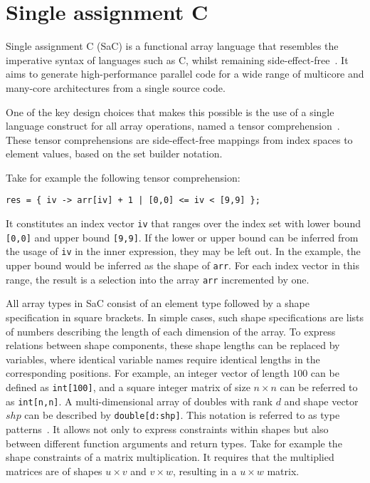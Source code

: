 \section{Single assignment C}\label{sac}
Single assignment C (SaC) is a functional array language that resembles the imperative syntax of
languages such as C, whilst remaining side-effect-free~\cite{sac1,sac2}. It aims to generate
high-performance parallel code for a wide range of multicore and many-core architectures from a
single source code.

One of the key design choices that makes this possible is the use of a single language construct for
all array operations, named a tensor comprehension~\cite{sac-tensor}. These tensor comprehensions
are side-effect-free mappings from index spaces to element values, based on the set builder
notation.

Take for example the following tensor comprehension:
\begin{verbatim}
res = { iv -> arr[iv] + 1 | [0,0] <= iv < [9,9] };
\end{verbatim}

It constitutes an index vector \verb|iv| that ranges over the index set with lower bound
\verb|[0,0]| and upper bound \verb|[9,9]|. If the lower or upper bound can be inferred from the
usage of \verb|iv| in the inner expression, they may be left out. In the example, the upper bound
would be inferred as the shape of \verb|arr|. For each index vector in this range, the result is a
selection into the array \verb|arr| incremented by one.

All array types in SaC consist of an element type followed by a shape specification in square
brackets. In simple cases, such shape specifications are lists of numbers describing the length of
each dimension of the array. To express relations between shape components, these shape lengths can
be replaced by variables, where identical variable names require identical lengths in the
corresponding positions. For example, an integer vector of length $100$ can be defined as
\verb|int[100]|, and a square integer matrix of size $n \times n$ can be referred to as
\verb|int[n,n]|. A multi-dimensional array of doubles with rank $d$ and shape vector $shp$ can be
described by \verb|double[d:shp]|. This notation is referred to as type
patterns~\cite{sac-typepattern}. It allows not only to express constraints within shapes but also
between different function arguments and return types. Take for example the shape constraints of a
matrix multiplication. It requires that the multiplied matrices are of shapes $u \times v$ and $v
\times w$, resulting in a $u \times w$ matrix.

